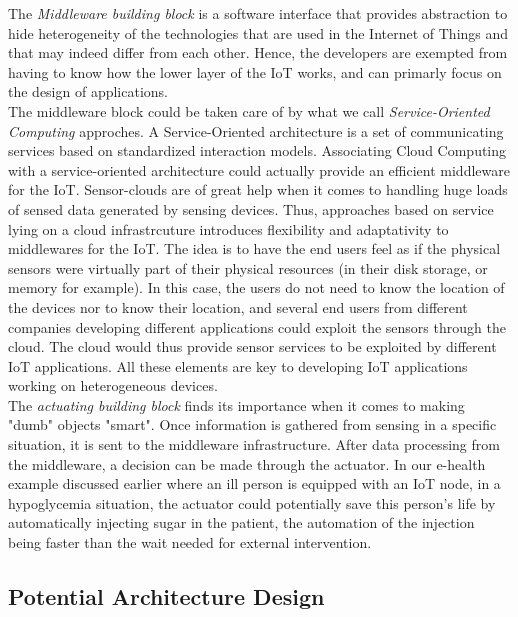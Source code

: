 The \textit{Middleware building block} is a software interface that provides abstraction to hide heterogeneity of the technologies that are used in the Internet of Things and that may indeed differ from each other. Hence, the developers are exempted from having to know how the lower layer of the IoT works, and can primarly focus on the design of applications. \\

The middleware block could be taken care of by what we call \textit{Service-Oriented Computing} approches. A Service-Oriented architecture is a set of communicating services based on standardized interaction models. Associating Cloud Computing with a service-oriented architecture could actually provide an efficient middleware for the IoT. Sensor-clouds are of great help when it comes to handling huge loads of sensed data generated by sensing devices. Thus, approaches based on service lying on a cloud infrastrcuture introduces flexibility and adaptativity to middlewares for the IoT. The idea is to have the end users feel as if the physical sensors were virtually part of their physical resources (in their disk storage, or memory for example). In this case, the users do not need to know the location of the devices nor to know their location, and several end users from different companies developing different applications could exploit the sensors through the cloud. The cloud would thus provide sensor services to be exploited by different IoT applications. All these elements are key to developing IoT applications working on heterogeneous devices. \\

The \textit{actuating building block} finds its importance when it comes to making "dumb" objects "smart". Once information is gathered from sensing in a specific situation, it is sent to the middleware infrastructure. After data processing from the middleware, a decision can be made through the actuator. In our e-health example discussed earlier where an ill person is equipped with an IoT node, in a hypoglycemia situation, the actuator could potentially save this person's life by automatically injecting sugar in the patient, the automation of the injection being faster than the wait needed for external intervention. \\

\subsection{Potential Architecture Design}


